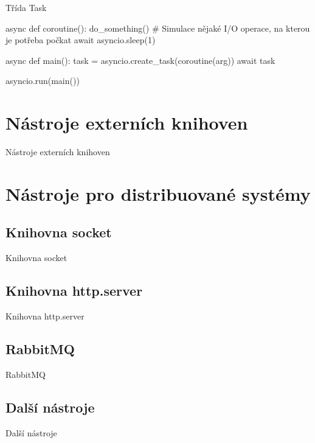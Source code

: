 \documentclass{beamer}
\begin{document}
\begin{frame}[fragile]{Třída Task}
    \scriptsize
    \begin{semiverbatim}
    async def coroutine(): 
    	do_something()
    	# Simulace nějaké I/O operace, na kterou je potřeba počkat
    	await asyncio.sleep(1) 

    async def main():
        task = asyncio.create_task(coroutine(arg))
        await task

    asyncio.run(main())
    \end{semiverbatim}
\end{frame}

\section{Nástroje externích knihoven}
\begin{frame}{Nástroje externích knihoven}

\end{frame}

\section{Nástroje pro distribuované systémy}
\subsection{Knihovna socket}
\begin{frame}{Knihovna socket}

\end{frame}

\subsection{Knihovna http.server}
\begin{frame}{Knihovna http.server}

\end{frame}

\subsection{RabbitMQ}
\begin{frame}{RabbitMQ}

\end{frame}

\subsection{Další nástroje}
\begin{frame}{Další nástroje}

\end{frame}
\end{document}
